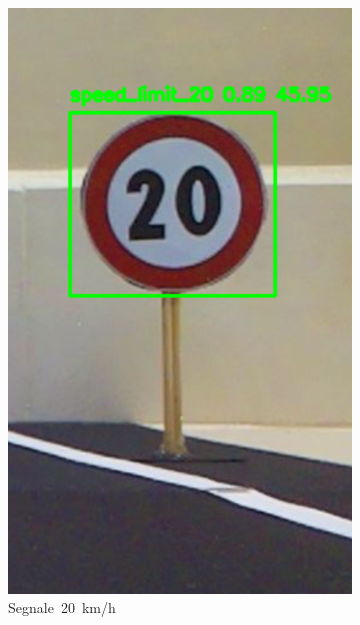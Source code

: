 \documentclass{article}
\begin{document}
\begin{figure}[h!]
\begin{subfigure}[b]{0.3\textwidth}
        \includegraphics[width=\linewidth]{20.png}
        \caption{Segnale 20 km/h}
        \label{fig:20}
    \end{subfigure}
    \hfill
    \begin{subfigure}[b]{0.3\textwidth}
        \centering

\end{subfigure}
\end{figure}
\end{document}
